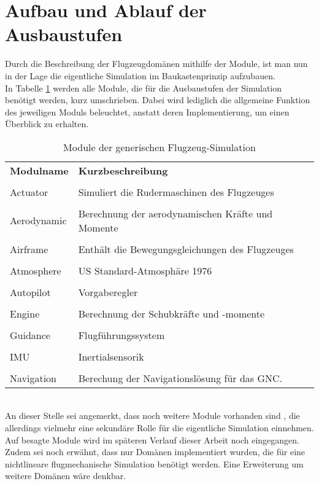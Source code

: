 \section{Aufbau und Ablauf der Ausbaustufen}
\label{sec:Ausbaustufen}
Durch die Beschreibung der Flugzeugdomänen mithilfe der Module, ist man nun in der Lage die eigentliche Simulation im Baukastenprinzip aufzubauen.\\ In Tabelle \ref{tab:Modulbeschreibungen} werden alle Module, die für die Ausbaustufen der Simulation benötigt werden, kurz umschrieben. Dabei wird lediglich die allgemeine Funktion des jeweiligen Moduls beleuchtet, anstatt deren Implementierung, um einen Überblick zu erhalten. \\
\begin{table}[h]
	\centering	\begin{tabular}{l p{9cm}}
		\textbf{Modulname} & \textbf{Kurzbeschreibung}\\\\
		Actuator	& Simuliert die Rudermaschinen des Flugzeuges\\\\
		Aerodynamic & Berechnung der aerodynamischen Kräfte und Momente\\\\
		Airframe & Enthält die Bewegungsgleichungen des Flugzeuges\\\\
		Atmosphere & US Standard-Atmosphäre 1976\\\\
		Autopilot & Vorgaberegler\\\\
		Engine & Berechnung der Schubkräfte und -momente\\\\
		Guidance & Flugführungssystem\\\\
		IMU & Inertialsensorik\\\\
		Navigation &  Berechung der Navigationslösung für das GNC.
	\end{tabular}
	\caption{Module der generischen Flugzeug-Simulation}
	\label{tab:Modulbeschreibungen}
\end{table}\\
An dieser Stelle sei angemerkt, dass noch weitere Module vorhanden sind , die allerdings vielmehr eine sekundäre Rolle für die eigentliche Simulation einnehmen. Auf besagte Module wird im späteren Verlauf dieser Arbeit noch eingegangen. Zudem sei noch erwähnt, dass nur Domänen implementiert wurden, die für eine nichtlineare flugmechanische Simulation benötigt werden. Eine Erweiterung um weitere Domänen wäre denkbar. \\
